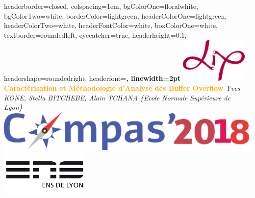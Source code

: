 \documentclass[landscape,a0paper,fontscale=0.3]{baposter} %
\begin{document}
\begin{poster}
{
headerborder=closed, %
colspacing=1em, %
bgColorOne=floralwhite, %
bgColorTwo=white, %
borderColor=lightgreen, %
headerColorOne=lightgreen, %
headerColorTwo=white, %
headerFontColor=white, %
boxColorOne=white, %
textborder=roundedleft, %
eyecatcher=true, %
headerheight=0.1\textheight, %
headershape=roundedright, %
headerfont=\large\bf\textsc, %
linewidth=2pt %
}
%
{\includegraphics[height=6em]{logo_lip_HD}} %
{\bf\Large\textcolor{orange}{Caractérisation et Méthodologie d'Analyse des Buffer Overflow }\vspace{0.2em}} %
{\textsl{ \small Yves KONE, Stella BITCHEBE, Alain TCHANA \{Ecole Normale Supérieure de Lyon\}\\ \vspace{0.2em}
\includegraphics[width=0.2\linewidth]{compas18}}} %
{\includegraphics[height=6em]{enslogo}} %


\end{poster}
\end{document}
